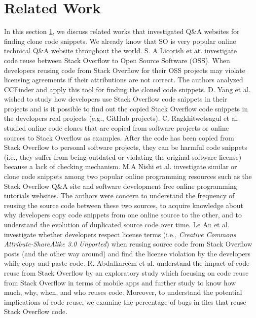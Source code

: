 \documentclass[conference]{IEEEtran}
\begin{document}
 \section{Related Work}\label{RW}
 In this section \ref{RW}, we discuss related works that investigated Q\&A websites for finding clone code snippets. We already know that SO is very popular online technical Q\&A website throughout the world. S. A Licorish et at. \cite{b14} investigate code reuse between Stack Overflow to Open Source Software (OSS). When developers reusing code from Stack Overflow for their OSS projects may violate licensing agreements if their attributions are not correct. The authors analyzed CCFinder and apply this tool for finding the cloned code snippets. D. Yang et al. \cite{b15} wished to  study how developers use Stack Overflow code snippets in their projects and is it possible to find out the copied Stack Overflow code snippets in the developers real projects (e.g., GitHub projects).  C. Ragkhitwetsagul  et al. \cite{b16} studied online code clones that are copied from software projects or online sources to Stack Overflow as examples.  After the code has been copied from Stack Overflow to personal software projects, they can be harmful code snippets (i.e., they suffer from being outdated or violating the original software license) because a lack of checking mechanism.  M.A Nishi et al. \cite{b1} investigate similar or clone code snippets among two popular online programming resources such as the Stack Overflow Q\&A site and software development free online programming tutorials websites. The authors were concern to understand the frequency of reusing the source code between these two sources, to acquire knowledge about why developers copy code snippets from one online source to the other, and to understand the evolution of duplicated source code over time. Le An et al. \cite{b5} investigate whether developers respect license terms (i.e., \textit{Creative Commons Attribute-ShareAlike 3.0 Unported}) when reusing source code from Stack Overflow posts (and the other way around) and find the license violation by the developers while copy and paste code. R. Abdalkareem et al. \cite{b1} understand the impact of code reuse from Stack Overflow by an exploratory study which focusing on code reuse from Stack Overflow in terms of mobile apps and further study to know how much, why, when, and who reuses code. Moreover, to understand the potential implications of code reuse, we examine the percentage of bugs in files that reuse Stack Overflow code.
\end{document}
